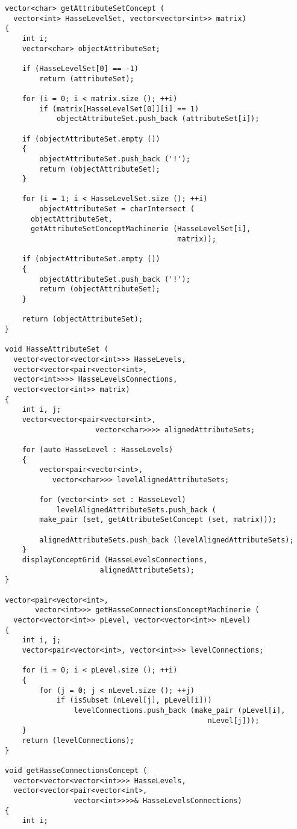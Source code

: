 \documentclass[spec, och, otchet, hidelinks]{SCWorks}
\begin{document}
\begin{lstlisting}[caption=Псевдокод алгоритма., mathescape]
vector<char> getAttributeSetConcept (
  vector<int> HasseLevelSet, vector<vector<int>> matrix)
{
	int i;
	vector<char> objectAttributeSet;

	if (HasseLevelSet[0] == -1)
		return (attributeSet);

	for (i = 0; i < matrix.size (); ++i)
		if (matrix[HasseLevelSet[0]][i] == 1)
			objectAttributeSet.push_back (attributeSet[i]);

	if (objectAttributeSet.empty ())
	{
		objectAttributeSet.push_back ('!');
		return (objectAttributeSet);
	}

	for (i = 1; i < HasseLevelSet.size (); ++i)
		objectAttributeSet = charIntersect (
      objectAttributeSet, 
      getAttributeSetConceptMachinerie (HasseLevelSet[i], 
                                        matrix));

	if (objectAttributeSet.empty ())
	{
		objectAttributeSet.push_back ('!');
		return (objectAttributeSet);
	}

	return (objectAttributeSet);
}

void HasseAttributeSet (
  vector<vector<vector<int>>> HasseLevels, 
  vector<vector<pair<vector<int>, 
  vector<int>>>> HasseLevelsConnections,
  vector<vector<int>> matrix)
{
	int i, j;
	vector<vector<pair<vector<int>, 
                     vector<char>>>> alignedAttributeSets;

	for (auto HasseLevel : HasseLevels)
	{
		vector<pair<vector<int>, 
           vector<char>>> levelAlignedAttributeSets;

		for (vector<int> set : HasseLevel)
			levelAlignedAttributeSets.push_back (
        make_pair (set, getAttributeSetConcept (set, matrix)));

		alignedAttributeSets.push_back (levelAlignedAttributeSets);
	}
	displayConceptGrid (HasseLevelsConnections, 
                      alignedAttributeSets);
}

vector<pair<vector<int>, 
       vector<int>>> getHasseConnectionsConceptMachinerie (
  vector<vector<int>> pLevel, vector<vector<int>> nLevel)
{
	int i, j;
	vector<pair<vector<int>, vector<int>>> levelConnections;

	for (i = 0; i < pLevel.size (); ++i)
	{
		for (j = 0; j < nLevel.size (); ++j)
			if (isSubset (nLevel[j], pLevel[i]))
				levelConnections.push_back (make_pair (pLevel[i], 
                                               nLevel[j]));
	}
	return (levelConnections);
}

void getHasseConnectionsConcept (
  vector<vector<vector<int>>> HasseLevels, 
  vector<vector<pair<vector<int>, 
                vector<int>>>>& HasseLevelsConnections)
{
	int i;


\end{lstlisting}
\end{document}
